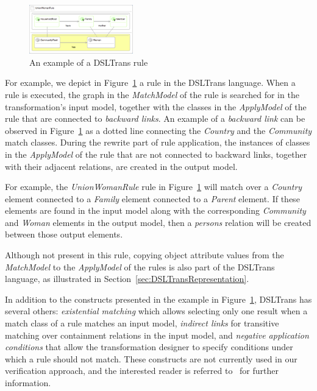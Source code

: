  \begin{figure}[t]
   \begin{center}
     \includegraphics[width=0.40\textwidth]{figures/FamToPersons/UWRule}
     \caption{An example of a DSLTrans rule}
     \label{fig:DSLTrans_rule}
   \end{center}
   \vspace{-0.25in}
 \end{figure}

For example, we depict in Figure~\ref{fig:DSLTrans_rule} a
rule in the DSLTrans language.
When a rule is executed, the graph in the \emph{MatchModel} of the rule is searched for in the transformation's input model, together with the classes in the \emph{ApplyModel} of the rule that are connected to \emph{backward
links}. An example of a \emph{backward link} can be observed in
Figure~\ref{fig:DSLTrans_rule} as a dotted line connecting the \emph{Country} and the
\emph{Community} match classes. During the rewrite part of rule application,
the instances of classes in the \emph{ApplyModel} of the rule that are not connected to
backward links, together with their adjacent relations, are created in the
output model.

For example, the \emph{UnionWomanRule} rule in Figure~\ref{fig:DSLTrans_rule} will match over a \emph{Country} element connected to a \emph{Family} element connected to a \emph{Parent} element. If these elements are found in the input model along with the corresponding \emph{Community} and \emph{Woman} elements in the output model, then a \emph{persons} relation will be created between those output elements.

Although not present in this rule,
copying object attribute values from the \emph{MatchModel} to the \emph{ApplyModel} of the rules is
also part of the DSLTrans language, as illustrated in Section~\ref{sec:DSLTransRepresentation}.


In addition to the constructs presented in the example in
Figure~\ref{fig:DSLTrans_rule}, DSLTrans has several others:
\emph{existential matching} which allows selecting only one result when a match class of a rule
matches an input model, \emph{indirect links} for transitive matching
over containment relations in the input model, and \emph{negative application
conditions} that allow the transformation designer to specify conditions under
which a rule should not match. These constructs are not currently used in
our verification approach, and the interested reader is referred to~\cite{Barroca2011} for further information.


